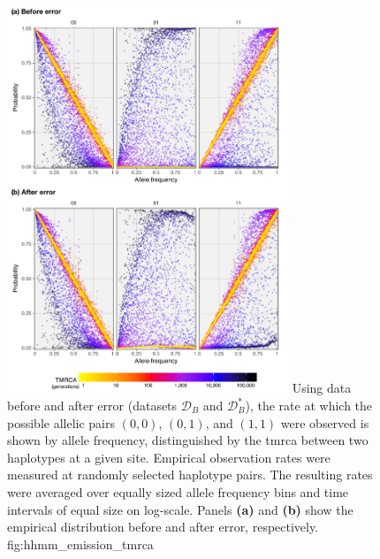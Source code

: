 

\begin{figure}[!htb]
\centering
\includegraphics[width=0.75\textwidth]{./img/ch5/hhmm_emission_tmrca_lowres}
{Using data before and after error (datasets $\mathcal{D}_B$ and $\mathcal{D}_B^{\ast}$), the rate at which the possible allelic pairs $(0,0)$, $(0,1)$, and $(1,1)$ were observed is shown by allele frequency, distinguished by the \gls{tmrca} between two haplotypes at a given site.
Empirical observation rates were measured at  randomly selected haplotype pairs.
The resulting rates were averaged over  equally sized allele frequency bins and  time intervals of equal size on log-scale.
Panels \textbf{(a)} and \textbf{(b)} show the empirical distribution before and after error, respectively.}
{fig:hhmm_emission_tmrca}
\end{figure}
